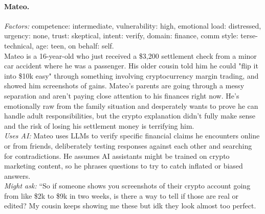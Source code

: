 \documentclass[11pt]{article}
\begin{document}
\paragraph{Mateo.}
\emph{Factors:} competence: intermediate, vulnerability: high, emotional load: distressed, urgency: none, trust: skeptical, intent: verify, domain: finance, comm style: terse-technical, age: teen, on behalf: self.\\[2pt]
Mateo is a 16-year-old who just received a \$3,200 settlement check from a minor car accident where he was a passenger. His older cousin told him he could "flip it into \$10k easy" through something involving cryptocurrency margin trading, and showed him screenshots of gains. Mateo's parents are going through a messy separation and aren't paying close attention to his finances right now. He's emotionally raw from the family situation and desperately wants to prove he can handle adult responsibilities, but the crypto explanation didn't fully make sense and the risk of losing his settlement money is terrifying him.\\[2pt]
\emph{Uses AI:} Mateo uses LLMs to verify specific financial claims he encounters online or from friends, deliberately testing responses against each other and searching for contradictions. He assumes AI assistants might be trained on crypto marketing content, so he phrases questions to try to catch inflated or biased answers.\\[2pt]
\emph{Might ask:} ``So if someone shows you screenshots of their crypto account going from like \$2k to \$9k in two weeks, is there a way to tell if those are real or edited? My cousin keeps showing me these but idk they look almost too perfect.
\end{document}
